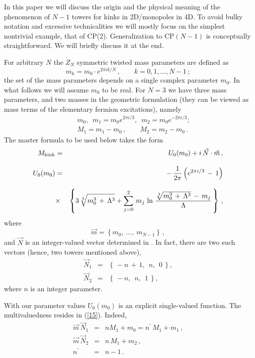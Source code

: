 \documentclass[epsfig,12pt]{article}
\def\beq{\begin{equation}}
\def\eeq{\end{equation}}
\def\beq{\begin{equation}}
\def\eeq{\end{equation}}
\begin{document}
	In this paper we will discuss the origin and the physical meaning of the phenomenon of $N-1$ towers for 
	kinks in 2D/monopoles in 4D. To avoid bulky notation and excessive 
	technicalities we will mostly focus on the simplest nontrivial example,
	that of CP(2). Generalization to CP$(N-1)$ is conceptually straightforward. We will briefly discuss it at the end.
	
	For arbitrary $N$ the $Z_N$ symmetric twisted mass parameters are defined as
	\beq
\label{mcirc}
	m_k = m_0 \cdot e^{2 \pi i k / N}\,,\qquad k=0,1, ..., N-1\,;
\eeq
	the set of the mass parameters depends on  a single complex parameter $ m_0 $.
	In what follows we will assume $m_0$ to be real. For $N=3$ we have three mass parameters, 
	and two masses in the geometric formulation (they can be viewed as mass terms of the 
	elementary fermion excitations),
	namely
	\begin{eqnarray}
	&& m_0,\,\,\, m_1 = m_0 e^{2 \pi i  / 3},\,\,\, m_2 = m_0 e^{-2 \pi i  / 3};
	\nonumber\\[2mm]
	&&M_1 = m_1-m_0\, , \qquad M_2 = m_2 -m_0 \,.
	\end{eqnarray}
	The master formula to be used below takes the form
	\begin{eqnarray}
	M_{\rm kink} &=&
	 U_0 (m_0) + i\, \vec{N} \cdot \vec{m}\,,\nonumber\\[3mm]
	U_0 (m_0) 
	 &=& 
 -\, \frac{1}{2\pi} \left(  e^{2\pi i / 3} \,-\, 1 \right)
 \nonumber\\[3mm]
 &\times&
	\left\{ 3\, \sqrt[3] { m_0^3 \,+\, \Lambda^3 }  +
		\sum_{j=0}^2 \, m_j\, \ln \, \frac{ \sqrt[3] { m_0^3 \,+\, \Lambda^3 } \,-\, m_j } { \Lambda} \,\right\}\,,
	\end{eqnarray}
	where
	\beq
	\vec{m} = \left\{ m_0,~ ...,~ m_{N-1}\right\}\,,
	\eeq 
	and $\vec N$ is an integer-valued vector determined in \cite{Bolokhov:2011mp}. In fact, there are two such vectors (hence, two towers mentioned above),
\begin{eqnarray}
\label{ncp2}
	\vec{N}_1 &=& \left\{ \, -n \,+\, 1,~~ n,~~ 0 \,\right\},
	\nonumber\\[2mm]
	\vec{N}_2 &=& \left\{ \, -n ,~~ n,~~ 1 \,\right\},
	\label{15}
\end{eqnarray}
where $n$ is an integer parameter.

With our parameter values $ U_0 (m_0)$ is an explicit single-valued function. The multivaluedness 
resides in (\ref{15}). Indeed,
\begin{eqnarray}
\vec{m} \, \vec{N}_1  & =&
 n M_1 +m_0 = n^\prime \, M_1 + m_1\,,
\nonumber\\[2mm]
\vec{m} \, \vec{N}_2  & =&
 n\, M_1 + m_2\,,
 \nonumber\\[2mm]
n^\prime &=&
n-1\,.
\end{eqnarray}
\end{document}
